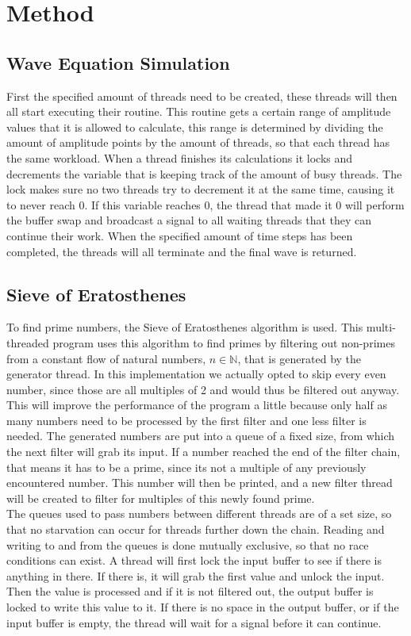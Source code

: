 \documentclass[a4paper,12px]{article}
\begin{document}
\section{Method}
\subsection{Wave Equation Simulation}

First the specified amount of threads need to be created, these threads will
then all start executing their routine. This routine gets a certain range of
amplitude values that it is allowed to calculate, this range is determined by
dividing the amount of amplitude points by the amount of threads, so that each
thread has the same workload. When a thread finishes its calculations it locks
and decrements the variable that is keeping track of the amount of busy threads.
The lock makes sure no two threads try to decrement it at the same time, causing
it to never reach 0.  If this variable reaches 0, the thread that made it 0 will
perform the buffer swap and broadcast a signal to all waiting threads that they
can continue their work. When the specified amount of time steps has been
completed, the threads will all terminate and the final wave is returned.

\subsection{Sieve of Eratosthenes}

To find prime numbers, the Sieve of Eratosthenes algorithm is used. This
multi-threaded program uses this algorithm to find primes by filtering out
non-primes from a constant flow of natural numbers, $n \in \mathbb{N}$, that is
generated by the generator thread. In this implementation we actually opted to
skip every even number, since those are all multiples of 2 and would thus be
filtered out anyway. This will improve the performance of the program a little
because only half as many numbers need to be processed by the first filter and
one less filter is needed. The generated numbers are put into a queue of a fixed
size, from which the next filter will grab its input. If a number reached the
end of the filter chain, that means it has to be a prime, since its not a
multiple of any previously encountered number. This number will then be printed,
and a new filter thread will be created to filter for multiples of this newly
found prime.\\
The queues used to pass numbers between different threads are of a set size, so
that no starvation can occur for threads further down the chain. Reading and
writing to and from the queues is done mutually exclusive, so that no race
conditions can exist. A thread will first lock the input buffer to see if there
is anything in there. If there is, it will grab the first value and unlock the
input. Then the value is processed and if it is not filtered out, the output
buffer is locked to write this value to it. If there is no space in the output
buffer, or if the input buffer is empty, the thread will wait for a signal
before it can continue.
\end{document}
